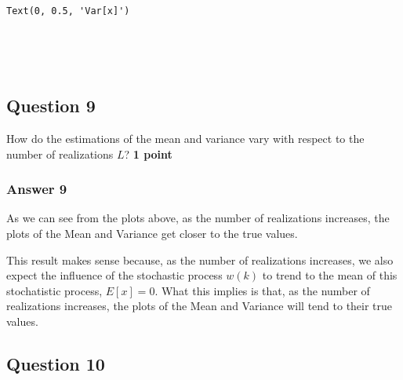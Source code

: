 \documentclass[11pt]{article}
\makeatletter
\newcommand{\boxspacing}{\kern\kvtcb@left@rule\kern\kvtcb@boxsep}
\newcommand{\prompt}[4]{
        \ttfamily\llap{{\color{#2}[#3]:\hspace{3pt}#4}}\vspace{-\baselineskip}
    }
\makeatother
\begin{document}
            \begin{tcolorbox}[breakable, size=fbox, boxrule=.5pt, pad at break*=1mm, opacityfill=0]
\prompt{Out}{outcolor}{22}{\boxspacing}
\begin{Verbatim}[commandchars=\\\{\}]
Text(0, 0.5, 'Var[x]')
\end{Verbatim}
\end{tcolorbox}
        
    \begin{center}
    \end{center}
    { \hspace*{\fill} \\}
    
    \begin{center}
    \end{center}
    { \hspace*{\fill} \\}
    
    \hypertarget{question-9}{%
\subsection{Question 9}\label{question-9}}

How do the estimations of the mean and variance vary with respect to the
number of realizations \(L\)? \textbf{1 point}

    \hypertarget{answer-9}{%
\subsubsection{Answer 9}\label{answer-9}}

As we can see from the plots above, as the number of realizations
increases, the plots of the Mean and Variance get closer to the true
values.

This result makes sense because, as the number of realizations
increases, we also expect the influence of the stochastic process
\(w(k)\) to trend to the mean of this stochatistic process, \(E[x]=0\).
What this implies is that, as the number of realizations increases, the
plots of the Mean and Variance will tend to their true values.

    \hypertarget{question-10}{%
\subsection{Question 10}\label{question-10}}
\end{document}
